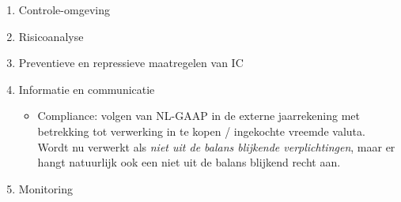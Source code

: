 \documentclass[10pt,a4paper,oneside]{report}
\begin{document}
\begin{enumerate}
    \item Controle-omgeving
    \item Risicoanalyse
    \item Preventieve en repressieve maatregelen van IC
    \item Informatie en communicatie
        \begin{itemize}
            \item Compliance: volgen van NL-GAAP in de externe jaarrekening met betrekking tot verwerking in te kopen / ingekochte vreemde valuta. Wordt nu verwerkt als \textit{niet uit de balans blijkende verplichtingen}, maar er hangt natuurlijk ook een niet uit de balans blijkend recht aan.
        \end{itemize}
    \item Monitoring
\end{enumerate}
\end{document}
